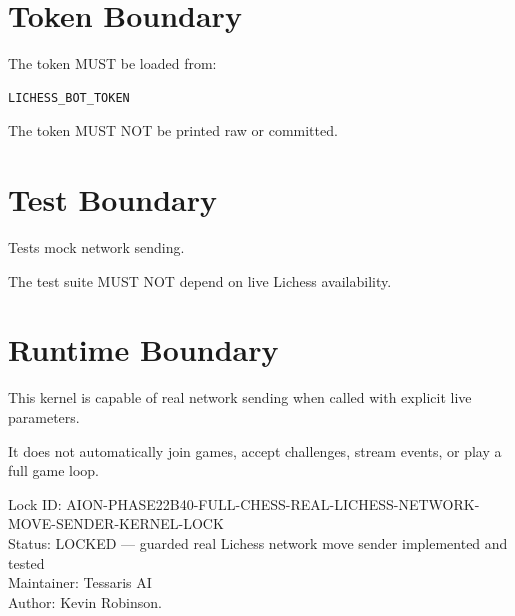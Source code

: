 \documentclass[11pt,a4paper]{article}
\begin{document}
\section{Token Boundary}

The token MUST be loaded from:

\begin{verbatim}
LICHESS_BOT_TOKEN
\end{verbatim}

The token MUST NOT be printed raw or committed.

\section{Test Boundary}

Tests mock network sending.

The test suite MUST NOT depend on live Lichess availability.

\section{Runtime Boundary}

This kernel is capable of real network sending when called with explicit live parameters.

It does not automatically join games, accept challenges, stream events, or play a full game loop.

\bigskip

\noindent
Lock ID: AION-PHASE22B40-FULL-CHESS-REAL-LICHESS-NETWORK-MOVE-SENDER-KERNEL-LOCK\\
Status: LOCKED --- guarded real Lichess network move sender implemented and tested\\
Maintainer: Tessaris AI\\
Author: Kevin Robinson.
\end{document}

